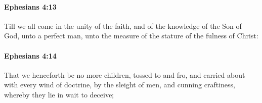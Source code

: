 		\paragraph{Ephesians 4:13} %
			\label{EPHESIANS-4-13}

			Till we all come in the unity of the faith, and of the knowledge of the Son of God, unto a perfect man, unto the measure of the stature of the fulness of Christ:

			\begin{framed}
			\scriptsize
				\begin{compactdesc}
					\item[SBLG] 
				\end{compactdesc}
			\end{framed}

		\paragraph{Ephesians 4:14} %
			\label{EPHESIANS-4-14}

			That we henceforth be no more children, tossed to and fro, and carried about with every wind of doctrine, by the sleight of men, and cunning craftiness, whereby they lie in wait to deceive;

